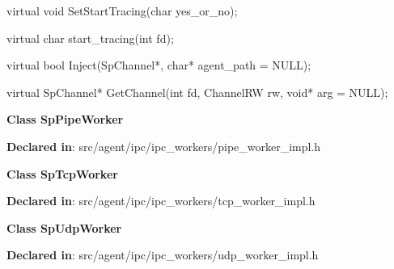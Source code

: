 \begin{apient}
virtual void SetStartTracing(char yes_or_no);
\end{apient}
\apidesc{
}

\begin{apient}
virtual char start_tracing(int fd);
\end{apient}
\apidesc{
}

\begin{apient}
virtual bool Inject(SpChannel*, char* agent_path = NULL);
\end{apient}
\apidesc{
}

\begin{apient}
virtual SpChannel* GetChannel(int fd,
                              ChannelRW rw,
                              void* arg = NULL);
\end{apient}
\apidesc{
}

\textbf{Class SpPipeWorker}

\textbf{Declared in}: src/agent/ipc/ipc\_workers/pipe\_worker\_impl.h

\textbf{Class SpTcpWorker}

\textbf{Declared in}: src/agent/ipc/ipc\_workers/tcp\_worker\_impl.h

\textbf{Class SpUdpWorker}

\textbf{Declared in}: src/agent/ipc/ipc\_workers/udp\_worker\_impl.h
